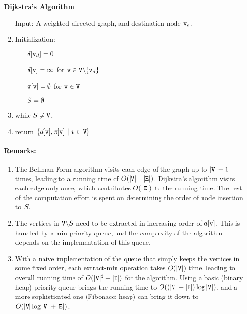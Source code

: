 \begin{algorithm_}\textbf{Dijkstra's Algorithm}
\begin{enumerate}
\item[ Input: ] A weighted directed graph, and destination node ${\tt v}_d$.

\item Initialization:
\begin{itemize}
  \item[] $d[{\tt v}_d] = 0$
  \item[] $d[{\tt v}] = \infty $ for ${\tt v} \in {\tt V}\backslash \{ {\tt v}_d\} $
  \item[] $\pi [{\tt v}] = \emptyset $ for ${\tt v} \in {\tt V}$
  \item[] ${S} = \emptyset $
\end{itemize}

\item while ${S} \ne {\tt V}$,




\item return $\{ d[\nodev],\policy [\nodev] \ |\ v \in \nodes\} $
\end{enumerate}
\end{algorithm_}

\paragraph{Remarks:}
\begin{enumerate}
  \item The Bellman-Form algorithm visits each edge of the graph up to $|{\tt V}|-1$ times, leading to a running time of $O(|{\tt V}|\, \cdot \,|{\tt E}|)$. Dijkstra's algorithm visits each edge only once, which contributes $O(\,|{\tt E}|)$ to the running time. The rest of the computation effort is spent on determining the order of node insertion to ${S}$.
  \item	The vertices in ${\tt V}\backslash {S}$ need to be extracted in increasing order of $d[{\tt v}]$.  This is handled by a min-priority queue, and the complexity of the algorithm depends on the implementation of this queue.
  \item	With a naive implementation of the queue that simply keeps the vertices in some fixed order, each extract-min operation takes  $O(|{\tt V}|)$ time, leading to overall running time of $O(|{\tt V}{|^2} + |{\tt E}|)$ for the algorithm. Using a basic (binary heap) priority queue brings the running time to $O((|{\tt V}| + |{\tt E}|)\log |{\tt V}|)$, and a more sophisticated one (Fibonacci heap) can bring it down to  $O(|{\tt V}|\log |{\tt V}| + |{\tt E}|)$.
\end{enumerate}

